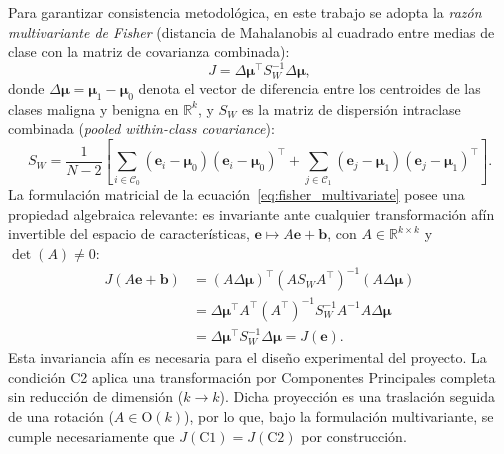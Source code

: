 Para garantizar consistencia metodológica, en este trabajo se adopta la
\textit{razón multivariante de Fisher} (distancia de Mahalanobis al cuadrado entre medias de
clase con la matriz de covarianza combinada):
\begin{equation}
  J = \Delta\boldsymbol{\mu}^\top S_W^{-1} \Delta\boldsymbol{\mu},
  \label{eq:fisher_multivariate}
\end{equation}
donde $\Delta\boldsymbol{\mu} = \boldsymbol{\mu}_1 - \boldsymbol{\mu}_0$ denota el vector de
diferencia entre los centroides de las clases maligna y benigna en $\mathbb{R}^k$, y $S_W$ es
la matriz de dispersión intraclase combinada (\textit{pooled within-class covariance}):
\begin{equation}
  S_W = \frac{1}{N - 2} \left[ \sum_{i \in \mathcal{C}_0} (\mathbf{e}_i - \boldsymbol{\mu}_0)(\mathbf{e}_i - \boldsymbol{\mu}_0)^\top + \sum_{j \in \mathcal{C}_1} (\mathbf{e}_j - \boldsymbol{\mu}_1)(\mathbf{e}_j - \boldsymbol{\mu}_1)^\top \right].
  \label{eq:pooled_covariance}
\end{equation}
La formulación matricial de la ecuación~\eqref{eq:fisher_multivariate} posee una propiedad
algebraica relevante: es invariante ante cualquier transformación afín
invertible del espacio de características, $\mathbf{e} \mapsto A\mathbf{e} + \mathbf{b}$,
con $A \in \mathbb{R}^{k \times k}$ y $\det(A) \neq 0$:
\begin{align}
  J(A\mathbf{e} + \mathbf{b}) &= (A\Delta\boldsymbol{\mu})^\top (A S_W A^\top)^{-1} (A\Delta\boldsymbol{\mu}) \nonumber \\
  &= \Delta\boldsymbol{\mu}^\top A^\top (A^\top)^{-1} S_W^{-1} A^{-1} A \Delta\boldsymbol{\mu} \nonumber \\
  &= \Delta\boldsymbol{\mu}^\top S_W^{-1} \Delta\boldsymbol{\mu} = J(\mathbf{e}).
  \label{eq:fisher_affine_invariance}
\end{align}
Esta invariancia afín es necesaria para el diseño experimental del proyecto. La condición
C2 aplica una transformación por Componentes Principales completa sin reducción de dimensión
($k \to k$). Dicha proyección es una traslación seguida de una rotación ($A \in \mathrm{O}(k)$),
por lo que, bajo la formulación multivariante, se cumple necesariamente que
$J(\text{C1}) = J(\text{C2})$ por construcción.
